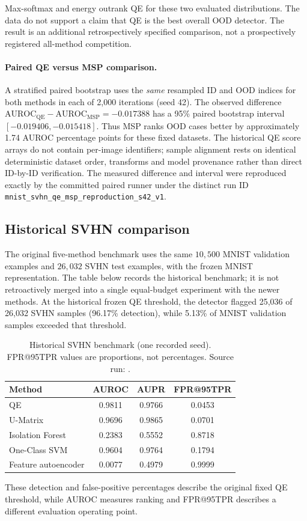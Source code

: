 \documentclass[11pt]{article}
\DeclareRobustCommand{\runcap}[1]{\texttt{\detokenize{#1}}}
\begin{document}
Max-softmax and energy outrank QE for these two evaluated distributions. The data do not support a claim that QE is the best overall OOD detector. The result is an additional retrospectively specified comparison, not a prospectively registered all-method competition.

\paragraph{Paired QE versus MSP comparison.}
A stratified paired bootstrap uses the \emph{same} resampled ID and OOD indices for both methods in each of 2,000 iterations (seed 42). The observed difference $\mathrm{AUROC}_{\mathrm{QE}}-\mathrm{AUROC}_{\mathrm{MSP}}=-0.017388$ has a 95\% paired bootstrap interval $[-0.019406,-0.015418]$. Thus MSP ranks OOD cases better by approximately 1.74 AUROC percentage points for these fixed datasets. The historical QE score arrays do not contain per-image identifiers; sample alignment rests on identical deterministic dataset order, transforms and model provenance rather than direct ID-by-ID verification. The measured difference and interval were reproduced exactly by the committed paired runner under the distinct run ID \texttt{mnist\_svhn\_qe\_msp\_reproduction\_s42\_v1}.

\subsection{Historical SVHN comparison}
The original five-method benchmark uses the same $10{,}500$ MNIST validation examples and $26{,}032$ SVHN test examples, with the frozen MNIST representation. The table below records the historical benchmark; it is not retroactively merged into a single equal-budget experiment with the newer methods. At the historical frozen QE threshold, the detector flagged 25,036 of 26,032 SVHN samples (96.17\% detection), while 5.13\% of MNIST validation samples exceeded that threshold.
\begin{table}[H]\centering\small
\caption{Historical SVHN benchmark (one recorded seed). FPR@95TPR values are proportions, not percentages. Source run: \runcap{mnist_svhn_five_method_comparison_s42_initial}.}\label{tab:svhn}
\begin{tabular}{@{}lccc@{}}\toprule
Method & AUROC & AUPR & FPR@95TPR\\\midrule
QE & 0.9811 & 0.9766 & 0.0453\\
U-Matrix & 0.9696 & 0.9865 & 0.0701\\
Isolation Forest & 0.2383 & 0.5552 & 0.8718\\
One-Class SVM & 0.9604 & 0.9764 & 0.1794\\
Feature autoencoder & 0.0077 & 0.4979 & 0.9999\\
\bottomrule\end{tabular}
\end{table}
These detection and false-positive percentages describe the original fixed QE threshold, while AUROC measures ranking and FPR@95TPR describes a different evaluation operating point.
\end{document}
